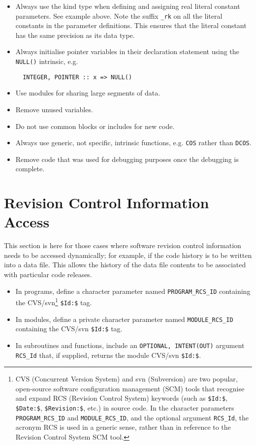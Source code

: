 \begin{itemize}
  \item Always use the kind type when defining and assigning real literal constant parameters. See example above. Note the suffix \texttt{\_rk} on all the literal constants in the parameter definitions. This ensures that the literal constant has the same precision as its data type.
  \item Always initialise pointer variables in their declaration statement using the \texttt{NULL()} intrinsic, e.g. 
  \begin{verbatim}
  INTEGER, POINTER :: x => NULL()\end{verbatim}
  \item Use modules for sharing large segments of data.
  \item Remove unused variables.
  \item Do not use common blocks or includes for new code.
  \item Always use generic, not specific, intrinsic functions, e.g. \texttt{COS} rather than \texttt{DCOS}.
  \item Remove code that was used for debugging purposes once the debugging is complete.
\end{itemize}


\section{Revision Control Information Access}
This section is here for those cases where software revision control information needs to be accessed dynamically; for example, if the code history is to be written into a data file. This allows the history of the data file contents to be associated with particular code releases.
\begin{itemize}
  \item In programs, define a character parameter named \texttt{PROGRAM\_RCS\_ID} containing the CVS/svn\footnote{CVS (Concurrent Version System) and svn (Subversion) are two popular, open-source software configuration management (SCM) tools that recognise and expand RCS (Revision Control System) keywords (such as \texttt{\$Id:\$}, \texttt{\$Date:\$}, \texttt{\$Revision:\$}, etc.) in source code. In the character parameters \texttt{PROGRAM\_RCS\_ID} and \texttt{MODULE\_RCS\_ID}, and the optional argument \texttt{RCS\_Id}, the acronym RCS is used in a generic sense, rather than in reference to the Revision Control System SCM tool.} \texttt{\$Id:\$} tag.
  \item In modules, define a private character parameter named \texttt{MODULE\_RCS\_ID} containing the CVS/svn \texttt{\$Id:\$} tag.
  \item In subroutines and functions, include an \texttt{OPTIONAL, INTENT(OUT)} argument \texttt{RCS\_Id} that, if supplied, returns the module CVS/svn \texttt{\$Id:\$}.
\end{itemize}


